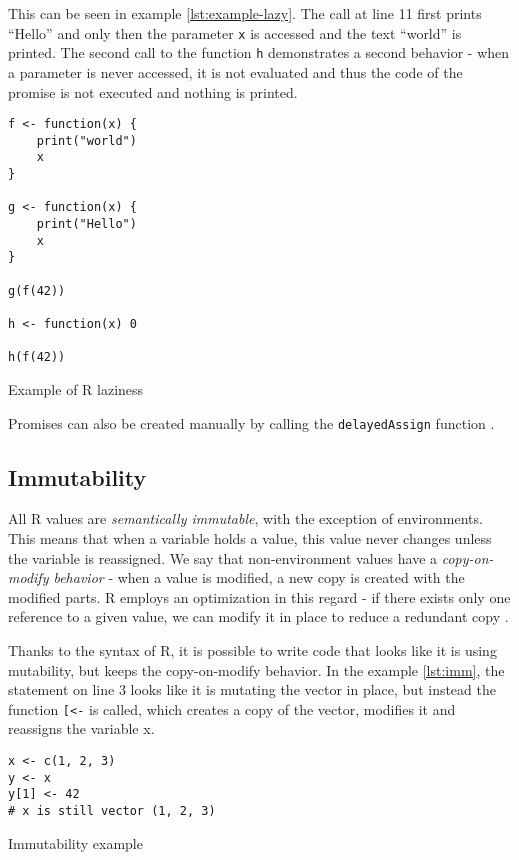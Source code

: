 This can be seen in example \ref{lst:example-lazy}. The call at line 11 first prints \enquote{Hello} and only then the parameter \texttt{x} is accessed and the text \enquote{world} is printed. The second call to the function \texttt{h} demonstrates a second behavior - when a parameter is never accessed, it is not evaluated and thus the code of the promise is not executed and nothing is printed.

\begin{listing}
	\centering
	\begin{verbatim}
f <- function(x) {
    print("world")
    x
}

g <- function(x) {
    print("Hello")
    x
}

g(f(42))

h <- function(x) 0

h(f(42))
  \end{verbatim}
	\caption{Example of R laziness}\label{lst:example-lazy}
\end{listing}

Promises can also be created manually by calling the \texttt{delayedAssign} function .

\subsection*{Immutability}

All R values are \textit{semantically immutable}, with the exception of environments. This means that when a variable holds a value, this value never changes unless the variable is reassigned. We say that non-environment values have a \textit{copy-on-modify behavior} - when a value is modified, a new copy is created with the modified parts. R employs an optimization in this regard - if there exists only one reference to a given value, we can modify it in place to reduce a redundant copy .

Thanks to the syntax of R, it is possible to write code that looks like it is using mutability, but keeps the copy-on-modify behavior. In the example \ref{lst:imm}, the statement on line 3 looks like it is mutating the vector in place, but instead the function \texttt{[<-} is called, which creates a copy of the vector, modifies it and reassigns the variable x.

\begin{listing}
	\centering
	\begin{verbatim}
x <- c(1, 2, 3)
y <- x
y[1] <- 42
# x is still vector (1, 2, 3)
  \end{verbatim}
	\caption{Immutability example}\label{lst:imm}
\end{listing}

